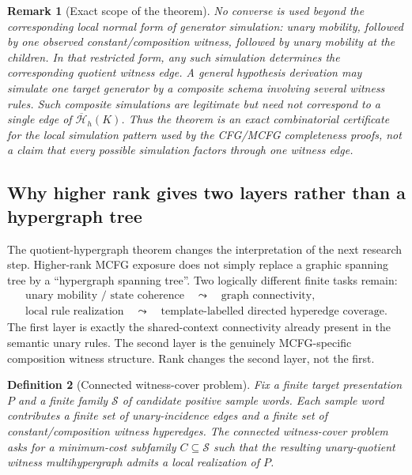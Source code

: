 \documentclass[11pt]{article}
\newtheorem{definition}{Definition}[section]
\newtheorem{remark}[definition]{Remark}
\begin{document}
\begin{remark}[Exact scope of the theorem]
No converse is used beyond the corresponding \emph{local normal form}
of generator simulation: unary mobility, followed by one observed
constant/composition witness, followed by unary mobility at the children.  In
that restricted form, any such simulation determines the corresponding
quotient witness edge.  A
general hypothesis derivation may simulate one target generator by a composite
schema involving several witness rules.  Such composite simulations are
legitimate but need not correspond to a single edge of
$\overline{\mathcal H}_h(K)$.  Thus the theorem is an exact combinatorial
certificate for the local simulation pattern used by the CFG/MCFG
completeness proofs, not a claim that every possible simulation factors through
one witness edge.
\end{remark}

\subsection{Why higher rank gives two layers rather than a hypergraph tree}

The quotient-hypergraph theorem changes the interpretation of the next
research step.  Higher-rank MCFG exposure does not simply replace a graphic
spanning tree by a ``hypergraph spanning tree''.  Two logically different
finite tasks remain:
\[
\boxed{
\begin{array}{c}
\text{unary mobility / state coherence}
\quad\leadsto\quad
\text{graph connectivity},\\[1mm]
\text{local rule realization}
\quad\leadsto\quad
\text{template-labelled directed hyperedge coverage}.
\end{array}}
\]
The first layer is exactly the shared-context connectivity already present in
the semantic unary rules.  The second layer is the genuinely MCFG-specific
composition witness structure.  Rank changes the second layer, not the
first.

\begin{definition}[Connected witness-cover problem]
\label{def:connected-witness-cover}
Fix a finite target presentation $P$ and a finite family $\mathcal S$ of
candidate positive sample words.  Each sample word contributes a finite set of
unary-incidence edges and a finite set of constant/composition witness
hyperedges.  The \emph{connected witness-cover} problem asks for a minimum-cost
subfamily $C\subseteq\mathcal S$ such that the resulting unary-quotient witness
multihypergraph admits a local realization of $P$.
\end{definition}
\end{document}
